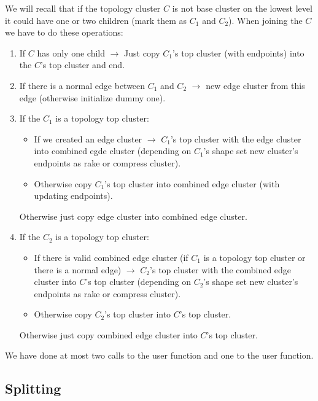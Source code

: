 We will recall that if the topology cluster $C$ is not base cluster on the
lowest level it could have one or two children (mark them as $C_1$ and $C_2$).
When joining the $C$ we have to do these operations:
\begin{enumerate}

\item If $C$ has only one child $\rightarrow$ Just copy $C_1$'s {\I top cluster}
(with endpoints) into the $C$'s {\I top cluster} and end.

\item If there is a normal edge between $C_1$ and $C_2$ $\rightarrow$ \Create{}
new {\I edge cluster} from this edge (otherwise initialize dummy one).

\item If the $C_1$ is a topology top cluster:
\begin{itemize}
\item If we created an {\I edge cluster} $\rightarrow$ \Join{} $C_1$'s {\I top
cluster} with the {\I edge cluster} into {\I combined egde cluster} (depending
on $C_1$'s shape set new cluster's endpoints as rake or compress cluster).
\item Otherwise copy $C_1$'s {\I top cluster} into {\I combined edge cluster}
(with updating endpoints).
\end{itemize}
Otherwise just copy {\I edge cluster} into {\I combined edge cluster}.

\item If the $C_2$ is a topology top cluster:
\begin{itemize}
\item If there is valid {\I combined edge cluster} (if $C_1$ is a topology top
cluster or there is a normal edge) $\rightarrow$ \Join{} $C_2$'s {\I top cluster}
with the {\I combined edge cluster} into $C$'s {\I top cluster} (depending
on $C_2$'s shape set new cluster's endpoints as rake or compress cluster).
\item Otherwise copy $C_2$'s {\I top cluster} into $C$'s {\I top cluster}.
\end{itemize}
Otherwise just copy {\I combined edge cluster} into $C$'s {\I top cluster}.

\end{enumerate}

We have done at most two calls to the \Join{} user function and one to the
\Create{} user function.

\subsection{Splitting}

